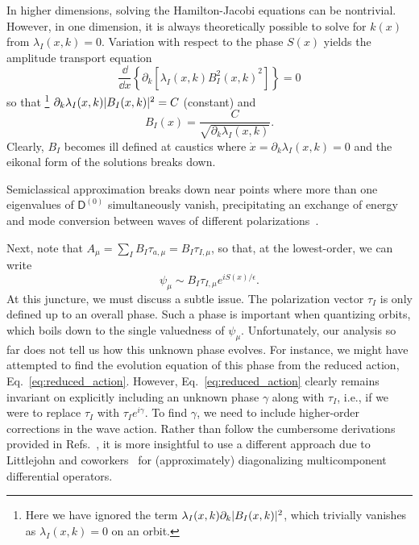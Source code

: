 In higher dimensions, solving the Hamilton-Jacobi equations can be nontrivial.
However, in one dimension, it is always theoretically possible to solve for $k(x)$ from $\lambda_{I}(x, k) = 0$.
Variation with respect to the phase $S(x)$ yields the amplitude transport equation
%
\begin{equation}
  \frac{\dd}{\dd{x}}\left\{\partial_{k}\left[\lambda_{I}(x, k){B^{2}_{I}(x, k)}^{2}\right]\right\} = 0
\end{equation}
%
so that%
\footnote{Here we have ignored the term $\lambda_{I}(x, k)\partial_{k}\lvert B_{I}(x,k)\rvert^{2}$, which trivially vanishes as $\lambda_{I}(x, k) = 0$ on an orbit.}
$\partial_{k}\lambda_{I}(x, k)\lvert B_{I}(x, k)\rvert^{2} = C$ (constant) and
%
\begin{equation}
  B_{I}(x) = \frac{C}{\sqrt{\partial_{k}\lambda_{I}(x, k)}}.
\end{equation}
%
Clearly, $B_{I}$ becomes ill defined at caustics where $\dot{x} = \partial_{k}\lambda_{I}(x, k) = 0$ and the eikonal form of the solutions breaks down.

Semiclassical approximation breaks down near points where more than one eigenvalues of $\mathsf{D}^{(0)}$ simultaneously vanish, precipitating an exchange of energy and mode conversion between waves of different polarizations~\cite{tracy2014}.

Next, note that $A_{\mu} = \sum_{I} B_{I} \tau_{a,\mu} = B_{I}\tau_{I,\mu}$, so that, at the lowest-order, we can write
%
\begin{equation}
  \psi_{\mu} \sim B_{I}\tau_{I,\mu}e^{iS(x)/\epsilon}.
\end{equation}
%
At this juncture, we must discuss a subtle issue.
The polarization vector $\tau_{I}$ is only defined up to an overall phase.
Such a phase is important when quantizing orbits, which boils down to the single valuedness of $\psi_{\mu}$.
Unfortunately, our analysis so far does not tell us how this unknown phase evolves.
For instance, we might have attempted to find the evolution equation of this phase from the reduced action, Eq.~\eqref{eq:reduced_action}.
However, Eq.~\eqref{eq:reduced_action} clearly remains invariant on explicitly including an unknown phase $\gamma$ along with $\tau_{I}$, i.e., if we were to replace $\tau_{I}$ with $\tau_{I}e^{i\gamma}$.
To find $\gamma$, we need to include higher-order corrections in the wave action.
Rather than follow the cumbersome derivations provided in Refs.~\cite{kaufman1987,yabana1986}, it is more insightful to use a different approach due to Littlejohn and coworkers~\cite{littlejohn1991,littlejohn1991a} for (approximately) diagonalizing multicomponent differential operators.

